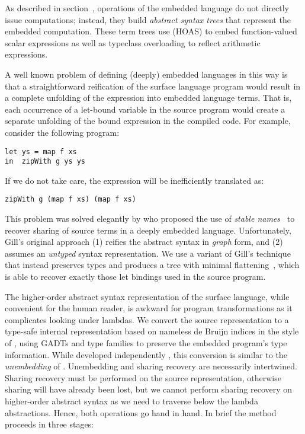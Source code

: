 As described in section~\derp, operations of the embedded language do not
directly issue computations; instead, they build \emph{abstract syntax
trees} that
represent the embedded computation. These term trees use  (HOAS) to embed
function-valued scalar expressions as well as typeclass overloading to reflect
arithmetic expressions.

A well known problem of defining (deeply) embedded languages in this way is that
a straightforward reification of the surface language program would result in a
complete unfolding of the expression into embedded language terms. That is, each
occurrence of a let-bound variable in the source program would create a separate
unfolding of the bound expression in the compiled code. For example, consider
the following program:
%
\begin{lstlisting}[style=Haskell]
let ys = map f xs
in  zipWith g ys ys
\end{lstlisting}
%
If we do not take care, the expression will be inefficiently translated as:
%
\begin{lstlisting}[style=Haskell]
zipWith g (map f xs) (map f xs)
\end{lstlisting}

This problem was solved elegantly by \citet{Gill:2009dx} who proposed the use
of \emph{stable names}~\cite{PeytonJones:2000ks} to recover
sharing of source terms in a deeply embedded language. Unfortunately, Gill's
original approach (1) reifies the abstract syntax in \emph{graph} form, and (2)
assumes an \emph{untyped} syntax representation. We use a variant of Gill's
technique that instead preserves types and produces a tree with minimal
flattening~\cite{McDonell:2013wi}, which is able to recover exactly those let
bindings used in the source program.

The higher-order abstract syntax
representation of the surface language, while convenient for the human reader,
is awkward for program transformations as it complicates looking under lambdas.
We convert the source representation to a type-safe internal representation
based on nameless de Bruijn indices in the style of
\citet{Altenkirch:2003kz}, using GADTs \cite{Jones:2006eh} and type families
\cite{Chakravarty:2005dx,Schrijvers:2008ir} to preserve the embedded program's
type information. While developed independently
\cite{McDonell:2013wi,Chakravarty:2009uo}, this conversion is similar to the
\emph{unembedding} of \citet{Atkey:2009dj}. Unembedding and sharing recovery are
necessarily intertwined. Sharing recovery must be performed on the source
representation, otherwise sharing will have already been lost, but we cannot
perform sharing recovery on higher-order abstract syntax as we need to traverse below the lambda abstractions. Hence,
both operations go hand in hand. In brief the method proceeds in three stages:


